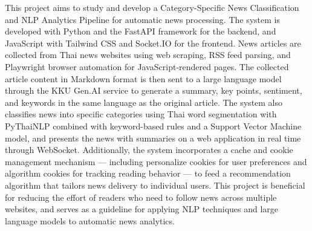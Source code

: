
This project aims to study and develop a Category-Specific News Classification and NLP Analytics Pipeline for automatic news processing. The system is developed with Python and the FastAPI framework for the backend, and JavaScript with Tailwind CSS and Socket.IO for the frontend. News articles are collected from Thai news websites using web scraping, RSS feed parsing, and Playwright browser automation for JavaScript-rendered pages. The collected article content in Markdown format is then sent to a large language model through the KKU Gen.AI service to generate a summary, key points, sentiment, and keywords in the same language as the original article. The system also classifies news into specific categories using Thai word segmentation with PyThaiNLP combined with keyword-based rules and a Support Vector Machine model, and presents the news with summaries on a web application in real time through WebSocket. Additionally, the system incorporates a cache and cookie management mechanism — including personalize cookies for user preferences and algorithm cookies for tracking reading behavior — to feed a recommendation algorithm that tailors news delivery to individual users. This project is beneficial for reducing the effort of readers who need to follow news across multiple websites, and serves as a guideline for applying NLP techniques and large language models to automatic news analytics.
